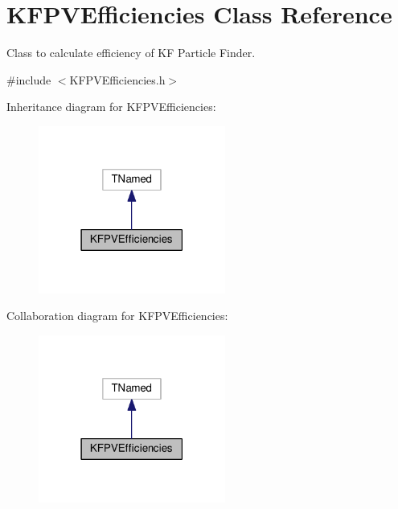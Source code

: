 \hypertarget{classKFPVEfficiencies}{}\section{K\+F\+P\+V\+Efficiencies Class Reference}
\label{classKFPVEfficiencies}


Class to calculate efficiency of KF Particle Finder.  




{\ttfamily \#include $<$K\+F\+P\+V\+Efficiencies.\+h$>$}



Inheritance diagram for K\+F\+P\+V\+Efficiencies\+:\nopagebreak
\begin{figure}[H]
\begin{center}
\leavevmode
\includegraphics[width=174pt]{classKFPVEfficiencies__inherit__graph}
\end{center}
\end{figure}


Collaboration diagram for K\+F\+P\+V\+Efficiencies\+:\nopagebreak
\begin{figure}[H]
\begin{center}
\leavevmode
\includegraphics[width=174pt]{classKFPVEfficiencies__coll__graph}
\end{center}
\end{figure}
